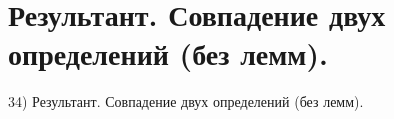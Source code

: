 \section{
 Результант. Совпадение двух определений (без лемм).
}

34) Результант. Совпадение двух определений (без лемм).
